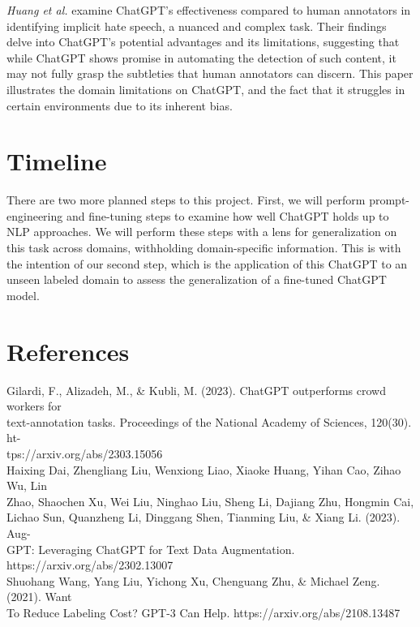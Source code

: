 \documentclass[12pt,a4paper]{article}
\begin{document}
\noindent \textit{Huang et al.} examine ChatGPT's effectiveness compared to human annotators in identifying implicit hate speech, a nuanced and complex task. Their findings delve into ChatGPT's potential advantages and its limitations, suggesting that while ChatGPT shows promise in automating the detection of such content, it may not fully grasp the subtleties that human annotators can discern. This paper illustrates the domain limitations on ChatGPT, and the fact that it struggles in certain environments due to its inherent bias. 

\section{Timeline}

\noindent There are two more planned steps to this project. First, we will perform prompt-engineering and fine-tuning steps to examine how well ChatGPT holds up to NLP approaches. We will perform these steps with a lens for generalization on this task across domains, withholding domain-specific information. This is with the intention of our second step, which is the application of this ChatGPT to an unseen labeled domain to assess the generalization of a fine-tuned ChatGPT model.

\section{References}

\noindent Gilardi, F., Alizadeh, M., \& Kubli, M. (2023). ChatGPT outperforms crowd workers for  \\
\indent text-annotation tasks. Proceedings of the National Academy of Sciences, 120(30). ht- \\
\indent tps://arxiv.org/abs/2303.15056 \\ 

\noindent Haixing Dai, Zhengliang Liu, Wenxiong Liao, Xiaoke Huang, Yihan Cao, Zihao Wu, Lin \\
\indent Zhao, Shaochen Xu, Wei Liu, Ninghao Liu, Sheng Li, Dajiang Zhu, Hongmin Cai, \\
\indent Lichao Sun, Quanzheng Li, Dinggang Shen, Tianming Liu, \& Xiang Li. (2023). Aug- \\
\indent GPT: Leveraging ChatGPT for Text Data Augmentation. https://arxiv.org/abs/2302.13007 \\

\noindent Shuohang Wang, Yang Liu, Yichong Xu, Chenguang Zhu, \& Michael Zeng. (2021). Want \\
\indent To Reduce Labeling Cost? GPT-3 Can Help. https://arxiv.org/abs/2108.13487 \\
\end{document}
